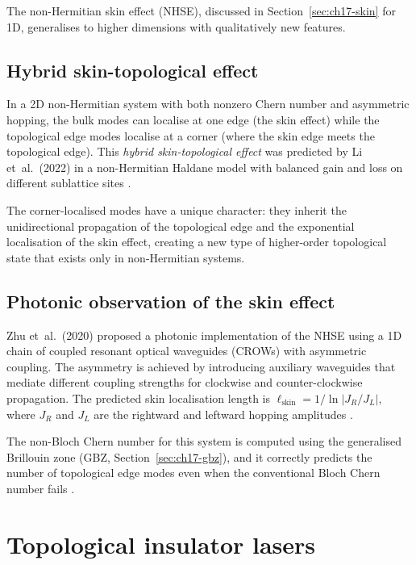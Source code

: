 The non-Hermitian skin effect (NHSE), discussed in
Section~\ref{sec:ch17-skin} for 1D, generalises to higher dimensions
with qualitatively new features.

\subsection{Hybrid skin-topological effect}
\label{sec:ch17-hybrid}

In a 2D non-Hermitian system with both nonzero Chern number and
asymmetric hopping, the bulk modes can localise at one edge (the skin
effect) while the topological edge modes localise at a corner (where
the skin edge meets the topological edge).  This \emph{hybrid
skin-topological effect} was predicted by Li et~al.\ (2022) in a
non-Hermitian Haldane model with balanced gain and loss on different
sublattice sites \cite{li2022gain}.

The corner-localised modes have a unique character: they inherit the
unidirectional propagation of the topological edge and the exponential
localisation of the skin effect, creating a new type of higher-order
topological state that exists only in non-Hermitian systems.

\subsection{Photonic observation of the skin effect}
\label{sec:ch17-skin-photonic}

Zhu et~al.\ (2020) proposed a photonic implementation of the NHSE
using a 1D chain of coupled resonant optical waveguides (CROWs) with
asymmetric coupling.  The asymmetry is achieved by introducing
auxiliary waveguides that mediate different coupling strengths for
clockwise and counter-clockwise propagation.  The predicted skin
localisation length is $\ell_{\mathrm{skin}}=1/\ln|J_R/J_L|$,
where $J_R$ and $J_L$ are the rightward and leftward hopping
amplitudes \cite{zhu2020photonic,lee2016anomalous}.

The non-Bloch Chern number for this system is computed using the
generalised Brillouin zone (GBZ, Section~\ref{sec:ch17-gbz}), and
it correctly predicts the number of topological edge modes even when
the conventional Bloch Chern number fails
\cite{gong2018topologicala,zhu2020photonic}.

\section{Topological insulator lasers}
\label{sec:ch17-topological-lasers}

